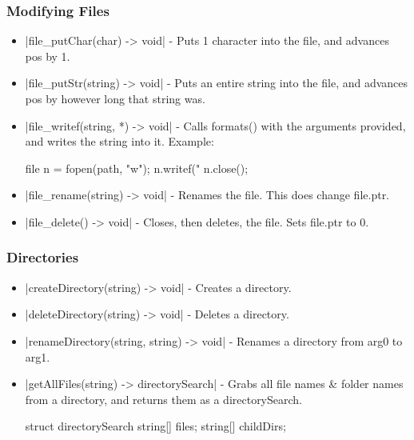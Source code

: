 \documentclass[12pt, letterpaper, oneside]{article}
\begin{document}
	\subsubsection{Modifying Files}
		\begin{itemize}
			\item[--] \spverb|file_putChar(char) -> void| - Puts 1 character into the file, and advances pos by 1.
			\item[--] \spverb|file_putStr(string) -> void| - Puts an entire string into the file, and advances pos by however long that string was.
			\item[--] \spverb|file_writef(string, *) -> void| - Calls formats() with the arguments provided, and writes the string into it. Example:
			
			\begin{spverbatim}
				file n = fopen(path, "w");
				n.writef("%
				n.close();
			\end{spverbatim}
			\newline
			\item[--] \spverb|file_rename(string) -> void| - Renames the file. This does change file.ptr.
			\item[--] \spverb|file_delete() -> void| - Closes, then deletes, the file. Sets file.ptr to 0.
		\end{itemize}
	\subsubsection{Directories}
		\begin{itemize}
			\item[--] \spverb|createDirectory(string) -> void| - Creates a directory.
			\item[--] \spverb|deleteDirectory(string) -> void| - Deletes a directory.
			\item[--] \spverb|renameDirectory(string, string) -> void| - Renames a directory from arg0 to arg1.
			\item[--] \spverb|getAllFiles(string) -> directorySearch| - Grabs all file names \& folder names from a directory, and returns them as a directorySearch.
			
			
			\begin{spverbatim}
				struct directorySearch {
					string[] files;
					string[] childDirs;
				}
			\end{spverbatim}
		\end{itemize}
	
	\newpage
\end{document}
